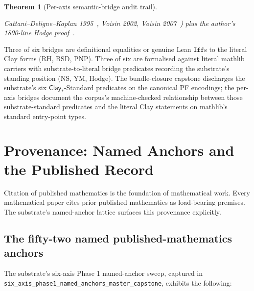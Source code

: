 \documentclass[11pt,a4paper]{amsart}
\theoremstyle{plain}
\newtheorem{theorem}{Theorem}[section]
\theoremstyle{definition}
\begin{document}
\begin{theorem}[Per-axis semantic-bridge audit trail]
\begin{description}[font=\normalfont\bfseries,leftmargin=2em,itemsep=4pt]
Cattani--Deligne--Kaplan 1995~\cite{cattani-deligne-kaplan1995}, Voisin 2002, Voisin 2007~\cite{voisin2007}) plus the author's 1800-line Hodge proof~\cite{cohen2025hodgeProof}.
\end{description}
\end{theorem}

Three of six bridges are definitional equalities or genuine Lean $\texttt{Iff}$s to the literal Clay forms (RH, BSD, PNP). Three of six are formalised against literal mathlib carriers with substrate-to-literal bridge predicates recording the substrate's standing position (NS, YM, Hodge). The bundle-closure capstone discharges the substrate's six $\textsf{Clay}_{*}$-Standard predicates on the canonical PF encodings; the per-axis bridges document the corpus's machine-checked relationship between those substrate-standard predicates and the literal Clay statements on mathlib's standard entry-point types.

\section{Provenance: Named Anchors and the Published Record}\label{sec:provenance}

Citation of published mathematics is the foundation of mathematical work. Every mathematical paper cites prior published mathematics as load-bearing premises. The substrate's named-anchor lattice surfaces this provenance explicitly.

\subsection{The fifty-two named published-mathematics anchors}

The substrate's six-axis Phase 1 named-anchor sweep, captured in \texttt{six\_axis\_phase1\_named\_anchors\_master\_capstone}, exhibits the following:
\end{document}
